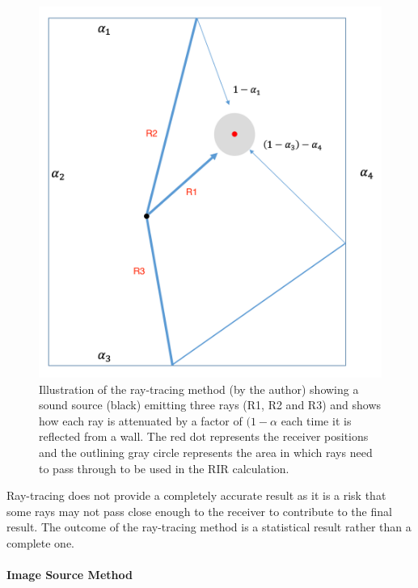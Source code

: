 \documentclass[../../main.tex]{subfiles}
\begin{document}
			\begin{figure}[H]
				\center\includegraphics[scale = 0.5]{Sections/Background/images/rayTracingImage_edit.png}
				\caption{Illustration of the ray-tracing method (by the author) showing a sound source (black) emitting three rays (R1, R2 and R3) and shows how each ray is attenuated by a factor of $(1-\alpha$ each time it is reflected from a wall. The red dot represents the receiver positions and the outlining gray circle represents the area in which rays need to pass through to be used in the \ac{RIR} calculation.}
				\label{rayTracingImage}
			\end{figure}

			Ray-tracing does not provide a completely accurate result as it is a risk that some rays may not pass close enough to the receiver to contribute to the final result. The outcome of the ray-tracing method is a statistical result rather than a complete one.

		\paragraph{Image Source Method}
\end{document}
